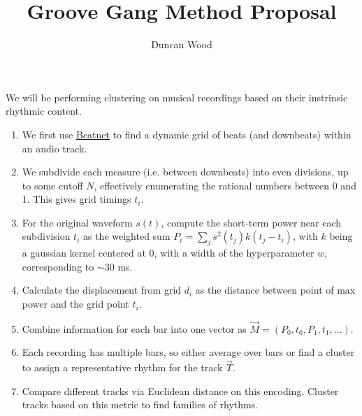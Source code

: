 \documentclass[12pt]{article}
\author{Duncan Wood}
\title{Groove Gang Method Proposal}
\begin{document}
\maketitle

We will be performing clustering on musical recordings 
          based on their instrinsic rhythmic content.

\begin{enumerate}
\item We first use \href{https://www.github.com/mjhydri/BeatNet}{Beatnet} 
        to find a dynamic grid of beats (and downbeats) within 
        an audio track. 
\item We subdivide each measure (i.e. between downbeats) into 
        even divisions, up to some cutoff $N$, effectively 
        enumerating the rational numbers between 0 and 1.
        This gives grid timings $t_i$.
\item For the original waveform $s(t)$, compute the short-term power 
        near each subdivision $t_i$ as the weighted sum 
        $P_i = \sum_j s^2(t_j) k(t_j - t_i) $, 
        with $k$ being a gaussian kernel centered at 0, with a width
        of the hyperparameter $w$, corresponding to $\sim 30$ ms.
\item Calculate the displacement from grid $d_i$ as the distance between
        point of max power and the grid point $t_i$. 
\item Combine information for each bar into one vector as 
        $\vec{M} = (P_0, t_0, P_1, t_1, ...)$.
\item Each recording has multiple bars, so either average over bars
        or find a cluster to assign a representative rhythm for the track $\vec{T}$.
\item Compare different tracks via Euclidean distance on this encoding. 
        Cluster tracks based on this metric to find families of rhythms. 
\end{enumerate}



\end{document}
